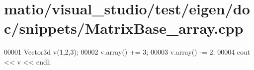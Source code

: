 \hypertarget{matio_2visual__studio_2test_2eigen_2doc_2snippets_2_matrix_base__array_8cpp_source}{}\section{matio/visual\+\_\+studio/test/eigen/doc/snippets/\+Matrix\+Base\+\_\+array.cpp}
\label{matio_2visual__studio_2test_2eigen_2doc_2snippets_2_matrix_base__array_8cpp_source}

\begin{DoxyCode}
00001 Vector3d v(1,2,3);
00002 v.array() += 3;
00003 v.array() -= 2;
00004 cout << v << endl;
\end{DoxyCode}
